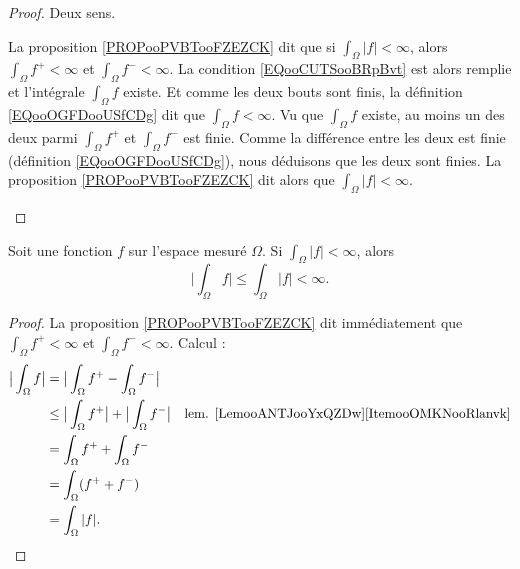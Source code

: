 \begin{proof}
	Deux sens.
	\begin{subproof}
		\spitem[\( \Rightarrow\)]
		La proposition \ref{PROPooPVBTooFZEZCK} dit que si \( \int_{\Omega}| f |<\infty\), alors \( \int_{\Omega}f^+<\infty \) et \( \int_{\Omega}f^-<\infty\). La condition \eqref{EQooCUTSooBRpBvt} est alors remplie et l'intégrale \( \int_{\Omega}f\) existe. Et comme les deux bouts sont finis, la définition \eqref{EQooOGFDooUSfCDg} dit que \( \int_{\Omega}f<\infty\).
		\spitem[\( \Leftarrow\)]
		Vu que \( \int_{\Omega}f\) existe, au moins un des deux parmi \( \int_{\Omega}f^+\) et \( \int_{\Omega}f^-\) est finie. Comme la différence entre les deux est finie (définition \eqref{EQooOGFDooUSfCDg}), nous déduisons que les deux sont finies. La proposition \ref{PROPooPVBTooFZEZCK} dit alors que \( \int_{\Omega}| f |<\infty\).
	\end{subproof}
\end{proof}

\begin{proposition}		\label{PROPooDOMBooIVNzlZ}
	Soit une fonction \( f\) sur l'espace mesuré \( \Omega\). Si \( \int_{\Omega}|f|<\infty\), alors
	\begin{equation}
		\big| \int_{\Omega}f \big|\leq \int_{\Omega}| f |<\infty.
	\end{equation}
\end{proposition}

\begin{proof}
	La proposition \ref{PROPooPVBTooFZEZCK} dit immédiatement que \( \int_{\Omega}f^+<\infty\) et \( \int_{\Omega}f^-<\infty\). Calcul :
	\begin{subequations}
		\begin{align}
			\big|  \int_{\Omega}f \big | & =\big| \int_{\Omega}f^+-\int_{\Omega}f^- \big|                                                                                \\
			                             & \leq \big| \int_{\Omega}f^+ \big |+\big| \int_{\Omega}f^- \big| & \text{lem. \ref{LemooANTJooYxQZDw}\ref{ItemooOMKNooRlanvk}} \\
			                             & = \int_{\Omega}f^++\int_{\Omega}f^-                                                                                           \\
			                             & =\int_{\Omega}(f^++f^-)                                                                                                       \\
			                             & =\int_{\Omega}| f |.
		\end{align}
	\end{subequations}
\end{proof}

